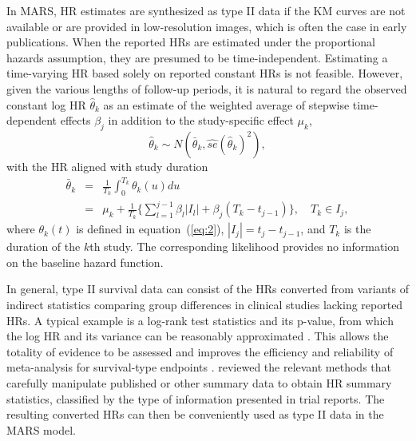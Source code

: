 \documentclass[12pt]{article}
\theoremstyle{mystyle}
\begin{document}
In MARS, HR estimates are synthesized as type II data if the KM curves are not available or are provided in low-resolution images, which is often the case in early publications. 
When the reported HRs are estimated under the proportional hazards assumption, they are presumed to be time-independent. Estimating a time-varying HR based solely on reported constant HRs is not feasible. However, given the various lengths of follow-up periods, it is natural to regard the observed constant log HR $\hat{\theta}_k$ as an estimate of the weighted average of stepwise time-dependent effects $\beta_j$ in addition to the study-specific effect $\mu_k$, 
\begin{equation*}
\hat{\theta}_k \sim N(\bar{\theta}_k, \hat{se}(\hat{\theta}_k)^2),
\end{equation*}
with the HR aligned with study duration
\begin{eqnarray*}
\bar{\theta}_k & = & \frac{1}{T_k} \int_{0}^{T_k}\theta_k(u)du\\
&=& \mu_k + \frac{1}{T_k}\{\sum_{l=1}^{j-1} \beta_l|I_l|+\beta_j(T_k-t_{j-1})\}, \quad T_k \in I_j,
\end{eqnarray*}
where $\theta_k(t)$ is defined in equation~(\ref{eq:2}), $|I_j|=t_j-t_{j-1}$, and $T_k$ is the duration of the $k$th study. The corresponding likelihood provides no information on the baseline hazard function.

In general, type II survival data can consist of the HRs converted from variants of indirect statistics comparing group differences in clinical studies lacking reported HRs. A typical example is a log-rank test statistics and its p-value, from which the log HR and its variance can be reasonably approximated \citep{Parmar1998}. 
This allows the totality of evidence to be assessed and improves the efficiency and reliability of meta-analysis for survival-type endpoints \citep{Tudur2001}.  
\cite{Tierney2007} reviewed the relevant methods that carefully manipulate published or other summary data to obtain HR summary statistics, classified by the type of information presented in trial reports. The resulting converted HRs can then be conveniently used as type II data in the MARS model.



\end{document}

